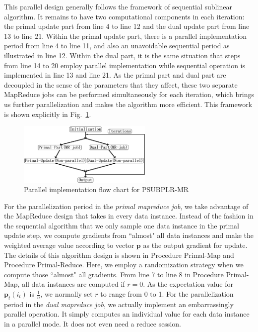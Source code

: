 \documentclass[10pt, conference, compsocconf]{IEEEtran}
\newcommand{\bp}{\mathbf{p}}
\begin{document}
This parallel design generally follows the framework of sequential sublinear algorithm.
It remains to have two computational components in each iteration: the primal update part from line 4 to line 12 and the dual update part from line 13 to line 21.
Within the primal update part, there is a parallel implementation period from line 4 to line 11, and also an unavoidable sequential period as illustrated in line 12.
Within the dual part, it is the same situation that steps from line 14 to 20 employ parallel implementation while sequential operation is implemented in line 13 and line 21.
As the primal part and dual part are decoupled in the sense of the parameters that they affect, these two separate MapReduce jobs can be performed simultaneously for each iteration, which brings us further parallelization and makes the algorithm more efficient.
This framework is shown explicitly in Fig.~\ref{fig:frame}.
%
\begin{figure}[tb]
\center \includegraphics[height=3.0cm,width=6.5cm]{img/framework.png}\vspace{-0.4cm}
\caption{Parallel implementation flow chart for PSUBPLR-MR}\label{fig:frame}\vspace{-0.5cm}
\end{figure}
%

For the parallelization period in the \textit{primal mapreduce job}, we take advantage of the MapReduce design that takes in every data instance.
Instead of the fashion in the sequential algorithm that we only sample one data instance in the primal update step, we compute gradients from ``almost" all data instances and make the weighted average value according to vector $\bp$ as the output gradient for update.
The details of this algorithm design is shown in Procedure Primal-Map and Procedure Primal-Reduce.
Here, we employ a randomization strategy when we compute those ``almost" all gradients.
From line 7 to line 8 in Procedure Primal-Map, all data instances are computed if $r=0$.
As the expectation value for $\bp_t(i_t)$ is $\frac{1}{n}$, we normally set $r$ to range from 0 to 1.
For the parallelization period in the \textit{dual mapreduce job}, we actually implement an embarrassingly parallel operation.
It simply computes an individual value for each data instance in a parallel mode. It does not even need a reduce session.
\end{document}
